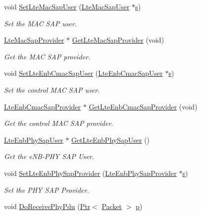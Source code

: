 \begin{DoxyCompactItemize}
void \hyperlink{classns3_1_1LteEnbMac_ab627dc850bdf6556b10492b89d957dfa}{Set\+Lte\+Mac\+Sap\+User} (\hyperlink{classns3_1_1LteMacSapUser}{Lte\+Mac\+Sap\+User} $\ast$\hyperlink{generate__test__data__lte__sinr_8m_ad83eeb3a142285d1243a08c6b7026df8}{s})
\begin{DoxyCompactList}\small\item\em Set the M\+AC S\+AP user. \end{DoxyCompactList}\item 
\hyperlink{classns3_1_1LteMacSapProvider}{Lte\+Mac\+Sap\+Provider} $\ast$ \hyperlink{classns3_1_1LteEnbMac_a1009dba29364b57da12d1d28a6a72ffa}{Get\+Lte\+Mac\+Sap\+Provider} (void)
\begin{DoxyCompactList}\small\item\em Get the M\+AC S\+AP provider. \end{DoxyCompactList}\item 
void \hyperlink{classns3_1_1LteEnbMac_a3296c59efbc9c628851764569f119811}{Set\+Lte\+Enb\+Cmac\+Sap\+User} (\hyperlink{classns3_1_1LteEnbCmacSapUser}{Lte\+Enb\+Cmac\+Sap\+User} $\ast$\hyperlink{generate__test__data__lte__sinr_8m_ad83eeb3a142285d1243a08c6b7026df8}{s})
\begin{DoxyCompactList}\small\item\em Set the control M\+AC S\+AP user. \end{DoxyCompactList}\item 
\hyperlink{classns3_1_1LteEnbCmacSapProvider}{Lte\+Enb\+Cmac\+Sap\+Provider} $\ast$ \hyperlink{classns3_1_1LteEnbMac_af3e9c74027edd0a5c6f9821f7159ad5c}{Get\+Lte\+Enb\+Cmac\+Sap\+Provider} (void)
\begin{DoxyCompactList}\small\item\em Get the control M\+AC S\+AP provider. \end{DoxyCompactList}\item 
\hyperlink{classns3_1_1LteEnbPhySapUser}{Lte\+Enb\+Phy\+Sap\+User} $\ast$ \hyperlink{classns3_1_1LteEnbMac_a332f1b19a6cd68dfeb0b5a9611313003}{Get\+Lte\+Enb\+Phy\+Sap\+User} ()
\begin{DoxyCompactList}\small\item\em Get the e\+N\+B-\/\+P\+HY S\+AP User. \end{DoxyCompactList}\item 
void \hyperlink{classns3_1_1LteEnbMac_a137b818896e0a966c2da865f427dacfb}{Set\+Lte\+Enb\+Phy\+Sap\+Provider} (\hyperlink{classns3_1_1LteEnbPhySapProvider}{Lte\+Enb\+Phy\+Sap\+Provider} $\ast$\hyperlink{generate__test__data__lte__sinr_8m_ad83eeb3a142285d1243a08c6b7026df8}{s})
\begin{DoxyCompactList}\small\item\em Set the P\+HY S\+AP Provider. \end{DoxyCompactList}\item 
void \hyperlink{classns3_1_1LteEnbMac_a066b988156499a00a2b5bac50292301e}{Do\+Receive\+Phy\+Pdu} (\hyperlink{classns3_1_1Ptr}{Ptr}$<$ \hyperlink{classns3_1_1Packet}{Packet} $>$ \hyperlink{lte__link__budget__x2__handover__measures_8m_ac9de518908a968428863f829398a4e62}{p})
\end{DoxyCompactItemize}
